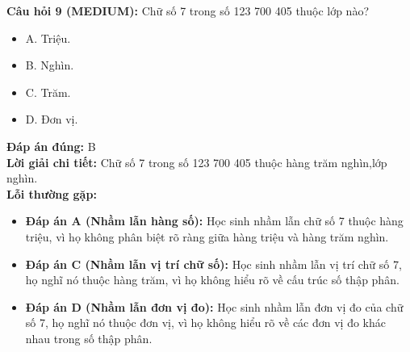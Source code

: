 \documentclass{article}
\begin{document}
\begin{minipage}{\textwidth}
\noindent\textbf{Câu hỏi 9 (MEDIUM):} Chữ số 7 trong số 123 700 405 thuộc lớp nào? 
\begin{itemize}[label={}]
    \item A. Triệu.
    \item B. Nghìn.
    \item C. Trăm.
    \item D. Đơn vị.
\end{itemize}
\textbf{Đáp án đúng:} B \\
\textbf{Lời giải chi tiết:} Chữ số 7 trong số 123 700 405 thuộc hàng trăm nghìn,lớp nghìn. \\
\textbf{Lỗi thường gặp:}
\begin{itemize}
  \item \textbf{Đáp án A (Nhầm lẫn hàng số):} Học sinh nhầm lẫn chữ số 7 thuộc hàng triệu, vì họ không phân biệt rõ ràng giữa hàng triệu và hàng trăm nghìn.
  \item \textbf{Đáp án C (Nhầm lẫn vị trí chữ số):} Học sinh nhầm lẫn vị trí chữ số 7, họ nghĩ nó thuộc hàng trăm, vì họ không hiểu rõ về cấu trúc số thập phân.
  \item \textbf{Đáp án D (Nhầm lẫn đơn vị đo):} Học sinh nhầm lẫn đơn vị đo của chữ số 7, họ nghĩ nó thuộc đơn vị, vì họ không hiểu rõ về các đơn vị đo khác nhau trong số thập phân.
\end{itemize}
\end{minipage}
\vspace{1em}
\end{document}
